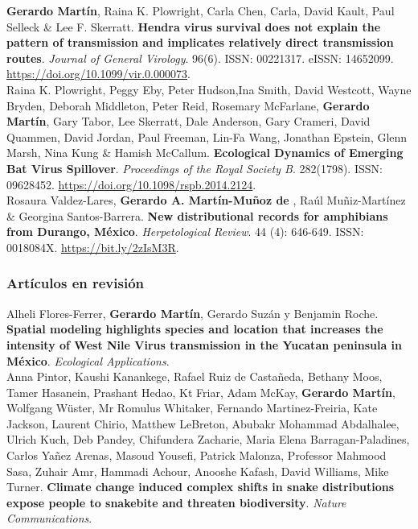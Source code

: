 \documentclass[11pt, letter]{article}
\newcommand{\years}[1]{\marginnote{\scriptsize #1}}
\begin{document}
\years{2015} \textbf{Gerardo Mart\'in}, Raina K. Plowright, Carla Chen, Carla, David Kault, Paul Selleck \& Lee F. Skerratt. \textbf{Hendra virus survival does not explain the pattern of transmission and implicates relatively direct transmission routes}. \emph{Journal of General Virology}. 96(6). ISSN: 00221317. eISSN: 14652099. \url{https://doi.org/10.1099/vir.0.000073}.\\

\years{2015} Raina K. Plowright, Peggy Eby, Peter Hudson,Ina Smith, David Westcott, Wayne Bryden, Deborah Middleton, Peter Reid, Rosemary McFarlane, \textbf{Gerardo Mart\'in}, Gary Tabor, Lee Skerratt, Dale Anderson, Gary Crameri, David Quammen, David Jordan, Paul Freeman, Lin-Fa Wang, Jonathan Epstein, Glenn Marsh, Nina Kung \& Hamish McCallum. \textbf{Ecological Dynamics of Emerging Bat Virus Spillover}. \emph{Proceedings of the Royal Society B}.  282(1798). ISSN: 09628452. \url{https://doi.org/10.1098/rspb.2014.2124}.\\

\years{2013} Rosaura Valdez-Lares, \textbf{Gerardo A. Mart\'in-Mu\~noz de }, Ra\'ul Mu\~niz-Mart\'inez \& Georgina Santos-Barrera. \textbf{New distributional records for amphibians from Durango, M\'exico}. \emph{Herpetological Review}. 44 (4): 646-649. ISSN: 0018084X. \url{https://bit.ly/2zIsM3R}.\\

\subsubsection*{Art\'iculos en revisión}

\years{2024} Alheli Flores-Ferrer, \textbf{Gerardo Martín}, Gerardo Suzán y Benjamin Roche. \textbf{Spatial modeling highlights species and location that increases the intensity of West Nile Virus transmission in the Yucatan peninsula in México}. \emph{Ecological Applications}. \\

\years{2024} Anna Pintor, Kaushi Kanankege, Rafael Ruiz de Castañeda, Bethany Moos, Tamer Hasanein, Prashant Hedao, Kt Friar, Adam McKay, \textbf{Gerardo Martín}, Wolfgang Wüster, Mr Romulus Whitaker, Fernando Martinez-Freiria, Kate Jackson, Laurent Chirio, Matthew LeBreton, Abubakr Mohammad Abdalhalee, Ulrich Kuch, Deb Pandey, Chifundera Zacharie, Maria Elena Barragan-Paladines, Carlos Yañez Arenas, Masoud Yousefi, Patrick Malonza, Professor Mahmood Sasa, Zuhair Amr, Hammadi Achour, Anooshe Kafash, David Williams, Mike Turner. \textbf{Climate change induced complex shifts in snake distributions expose people to snakebite and threaten biodiversity}. \emph{Nature Communications}.
\end{document}
